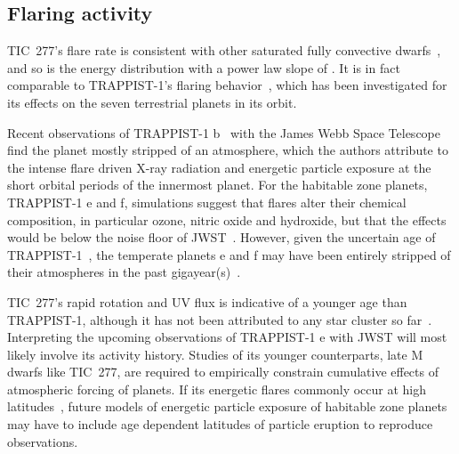 \documentclass[twocolumn]{aastex631}
\begin{document}
\subsection{Flaring activity}
\label{sec:discussion:flares}

TIC~277's flare rate is consistent with other saturated fully convective dwarfs~\citep{medina2020flare, murray2022study}, and so is the energy distribution with a power law slope of \ffdalpha. It is in fact comparable to TRAPPIST-1's flaring behavior~\citep{paudel2018k2}, which has been investigated for its effects on the seven terrestrial planets in its orbit. 

Recent observations of TRAPPIST-1 b~\citep{greene2023thermal, ih2023constraining} with the James Webb Space Telescope find the planet mostly stripped of an atmosphere, which the authors attribute to the intense flare driven X-ray radiation and energetic particle exposure at the short orbital periods of the innermost planet. For the habitable zone planets, TRAPPIST-1 e and f, simulations suggest that flares alter their chemical composition, in particular ozone, nitric oxide and hydroxide, but that the effects would be below the noise floor of JWST~\citep{chen2021persistence}. However, given the uncertain age of TRAPPIST-1~\citep{burgasser2017age, gonzales2019reanalysis, birky2021improved}, the temperate planets e and f may have been entirely stripped of their atmospheres in the past gigayear(s)~\citep{garraffo2017threatening}. 

TIC~277's rapid rotation and UV flux is indicative of a younger age than TRAPPIST-1, although it has not been attributed to any star cluster so far~\citep{schneider2018hazmat}. Interpreting the upcoming observations of TRAPPIST-1 e with JWST will most likely involve its activity history. Studies of its younger counterparts, late M dwarfs like TIC~277, are required to empirically constrain cumulative effects of atmospheric forcing of planets. If its energetic flares commonly occur at high latitudes~\citep{ilin2021giant}, future models of energetic particle exposure of habitable zone planets may have to include age dependent latitudes of particle eruption to reproduce observations. 
\end{document}

